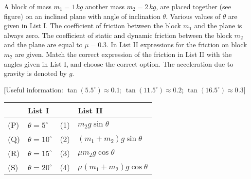 
\item A block of mass $m_1 = 1\, kg$ another mass $m_2 = 2\, kg$, are placed together (see figure) on an inclined plane with angle of inclination $\theta$. Various values of $\theta$ are given in List I. The coefficient of friction between the block $m_1$ and the plane is always zero. The coefficient of static and dynamic friction between the block $m_2$ and the plane are equal to $\mu = 0.3$. In List II expressions for the friction on block $m_2$ are given. Match the correct expression of the friction in List II with the angles given in List I, and choose the correct option. The acceleration due to gravity is denoted by $g$.

[Useful information: $\tan(5.5^\circ) \approx 0.1$; $\tan(11.5^\circ) \approx 0.2$; $\tan(16.5^\circ) \approx 0.3$]

\begin{center}
\end{center}

\begin{center}
    \renewcommand{\arraystretch}{2}
    \begin{table}[h]
        \centering
        \begin{tabular}{p{0.25cm}p{8cm}|p{0.25cm}p{5cm}}
        \hline
        & List I & & List II \\
        \hline
        (P)& $\theta = 5^\circ$ & (1)& $m_2g \sin\theta$\\
        (Q)& $\theta = 10^\circ$ & (2)& $(m_1 + m_2)g \sin\theta$\\
        (R)& $\theta = 15^\circ$ & (3)& $\mu m_2 g \cos\theta$\\
        (S)& $\theta = 20^\circ$ & (4)& $\mu(m_1 + m_2)g \cos\theta$\\
        \hline
        \end{tabular}
    \end{table}
\end{center}

